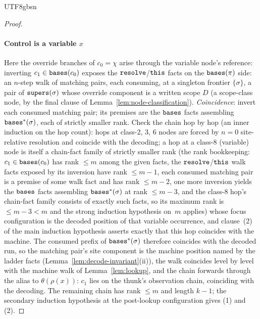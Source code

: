 \begin{CJK*}{UTF8}{gbsn}
\begin{proof}
  \paragraph{Control is a variable $x$}
  Here the override branches of $c_0 = \chi$ arise through the
  variable node's reference: inverting $c_1 \in \mathtt{bases}(c_0)$ exposes
  the $\mathtt{resolve}$/$\mathtt{this}$ facts on the $\mathtt{bases}(\pi)$ side: an
  $n$-step walk of matching pairs, each consuming, at a singleton
  frontier $\{\sigma\}$, a pair of $\mathtt{supers}(\sigma)$ whose override
  component is a written scope $D$ (a scope-class node, by the final
  clause of Lemma~\ref{lem:node-classification}).
  \emph{Coincidence}: invert each consumed matching pair; its
  premises are the $\mathtt{bases}$ facts assembling $\mathtt{bases}^*(\sigma)$,
  each of strictly smaller rank. Check the chain hop by hop (an
  inner induction on the hop count): hops at class-2, 3, 6 nodes are
  forced by $n = 0$ site-relative resolution and coincide with the
  decoding; a hop at a class-8 (variable) node is itself a
  chain-fact family of strictly smaller rank (the rank bookkeeping:
  $c_1 \in \mathtt{bases}(c_0)$ has rank $\le m$ among the given facts, the
  $\mathtt{resolve}$/$\mathtt{this}$ walk facts exposed by its inversion have rank
  $\le m - 1$, each consumed matching pair is a premise of some walk
  fact and has rank $\le m - 2$, one more inversion yields the
  $\mathtt{bases}$ facts assembling $\mathtt{bases}^*(\sigma)$ at rank $\le m - 3$,
  and the class-8 hop's chain-fact family consists of exactly such
  facts, so its maximum rank is $\le m - 3 < m$ and the strong
  induction hypothesis on~$m$ applies) whose focus configuration is
  the decoded position of that variable occurrence, and clause~(2)
  of the main induction hypothesis asserts exactly that this hop
  coincides with the machine. The consumed prefix of
  $\mathtt{bases}^*(\sigma)$ therefore coincides with the decoded run, so
  the matching pair's site component is the machine position named
  by the ladder facts (Lemma~\ref{lem:decode-invariant}(ii)), the
  walk coincides level by level with the machine walk of
  Lemma~\ref{lem:lookup}, and the chain forwards through the alias
  to $\theta(\rho(x))$: $c_1$ lies on the thunk's observation chain,
  coinciding with the decoding. The remaining chain has rank
  $\le m$ and length $k - 1$; the secondary induction hypothesis at
  the post-lookup configuration gives (1) and (2).
\fi
\end{proof}

\subsection{}


\end{CJK*}
